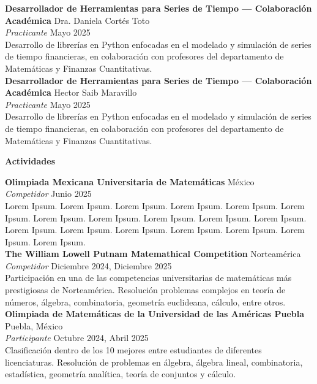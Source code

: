 \documentclass[8pt]{extarticle} %
\begin{document}
\textbf{Desarrollador de Herramientas para Series de Tiempo — Colaboración Académica} \hfill Dra. Daniela Cortés Toto \\
\textit{Practicante} \hfill Mayo 2025\\  
Desarrollo de librerías en Python enfocadas en el modelado y simulación de series de tiempo financieras, en colaboración con profesores del departamento de Matemáticas y Finanzas Cuantitativas. \\

\textbf{Desarrollador de Herramientas para Series de Tiempo — Colaboración Académica} \hfill Hector Saib Maravillo \\
\textit{Practicante} \hfill Mayo 2025\\  
Desarrollo de librerías en Python enfocadas en el modelado y simulación de series de tiempo financieras, en colaboración con profesores del departamento de Matemáticas y Finanzas Cuantitativas. \\




\begin{center}  
    \vspace{1ex}  
    \textbf{Actividades}  
    \vspace{-1ex}  
\end{center}

\textbf{Olimpiada Mexicana Universitaria de Matemáticas} \hfill México\\  
\textit{Competidor} \hfill Junio 2025\\  
Lorem Ipsum. Lorem Ipsum. Lorem Ipsum. Lorem Ipsum. Lorem Ipsum. Lorem Ipsum. Lorem Ipsum. Lorem Ipsum. Lorem Ipsum. Lorem Ipsum. Lorem Ipsum. Lorem Ipsum. Lorem Ipsum. Lorem Ipsum. Lorem Ipsum. Lorem Ipsum. Lorem Ipsum. Lorem Ipsum.\\

\textbf{The William Lowell Putnam Matemathical Competition} \hfill Norteamérica\\  
\textit{Competidor} \hfill Diciembre 2024, Diciembre 2025\\  
Participación en una de las competencias universitarias de matemáticas más prestigiosas de Norteamérica. Resolución problemas complejos en teoría de números, álgebra, combinatoria, geometría euclideana, cálculo, entre otros.\\

\textbf{Olimpiada de Matemáticas de la Universidad de las Américas Puebla} \hfill Puebla, México\\  
\textit{Participante} \hfill Octubre 2024, Abril 2025\\  
Clasificación dentro de los 10 mejores entre estudiantes de diferentes licenciaturas. Resolución de problemas en álgebra, álgebra lineal, combinatoria, estadística, geometría analítica, teoría de conjuntos y cálculo.\\
\end{document}
